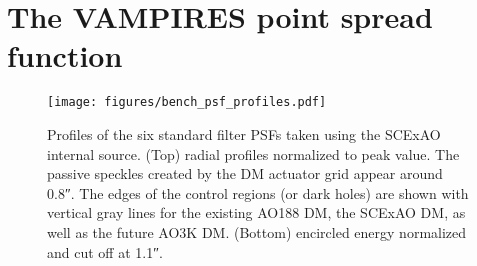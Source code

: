 \section{The VAMPIRES point spread function}\label{sec:psf}


\begin{figure}
    \centering
    \texttt{[image: figures/bench\_psf\_profiles.pdf]}
    \caption{Profiles of the six standard filter PSFs taken using the SCExAO internal source. (Top) radial profiles normalized to peak value. The passive speckles created by the DM actuator grid appear around \ang{;;0.8}. The edges of the control regions (or dark holes) are shown with vertical gray lines for the existing AO188 DM, the SCExAO DM, as well as the future AO3K DM. (Bottom) encircled energy normalized and cut off at \ang{;;1.1}.\label{fig:bench_profile}}
\end{figure}